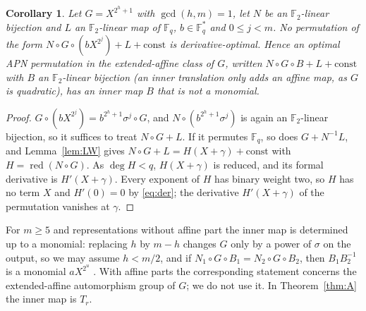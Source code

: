 \documentclass[preprint,12pt]{elsarticle}
\newtheorem{corollary}[theorem]{Corollary}
\theoremstyle{definition}
\newcommand{\F}{\mathbb{F}}
\newcommand{\red}{\operatorname{red}}
\begin{document}
\begin{corollary}\label{cor:P}
Let $G=X^{2^h+1}$ with $\gcd(h,m)=1$, let $N$ be an $\F_2$-linear bijection and $L$ an $\F_2$-linear map of $\F_q$, $b\in\F_q^*$ and $0\le j<m$. No permutation of the form $N\circ G\circ(bX^{2^j})+L+\text{const}$ is derivative-optimal. Hence an optimal APN permutation in the extended-affine class of $G$, written $N\circ G\circ B+L+\text{const}$ with $B$ an $\F_2$-linear bijection (an inner translation only adds an affine map, as $G$ is quadratic), has an inner map $B$ that is not a monomial.
\end{corollary}
\begin{proof}
$G\circ(bX^{2^j})=b^{2^h+1}\sigma^j\circ G$, and $N\circ(b^{2^h+1}\sigma^j)$ is again an $\F_2$-linear bijection, so it suffices to treat $N\circ G+L$. If it permutes $\F_q$, so does $G+N^{-1}L$, and Lemma~\ref{lem:LW} gives $N\circ G+L=H(X+\gamma)+\text{const}$ with $H=\red(N\circ G)$. As $\deg H<q$, $H(X+\gamma)$ is reduced, and its formal derivative is $H'(X+\gamma)$. Every exponent of $H$ has binary weight two, so $H$ has no term $X$ and $H'(0)=0$ by \eqref{eq:der}; the derivative $H'(X+\gamma)$ of the permutation vanishes at $\gamma$.
\end{proof}
For $m\ge5$ and representations without affine part the inner map is determined up to a monomial: replacing $h$ by $m-h$ changes $G$ only by a power of $\sigma$ on the output, so we may assume $h<m/2$, and if $N_1\circ G\circ B_1=N_2\circ G\circ B_2$, then $B_1B_2^{-1}$ is a monomial $aX^{2^u}$ \cite[Thm.~4.1]{KZ}. With affine parts the corresponding statement concerns the extended-affine automorphism group of $G$; we do not use it. In Theorem~\ref{thm:A} the inner map is $T_r$.
\end{document}
